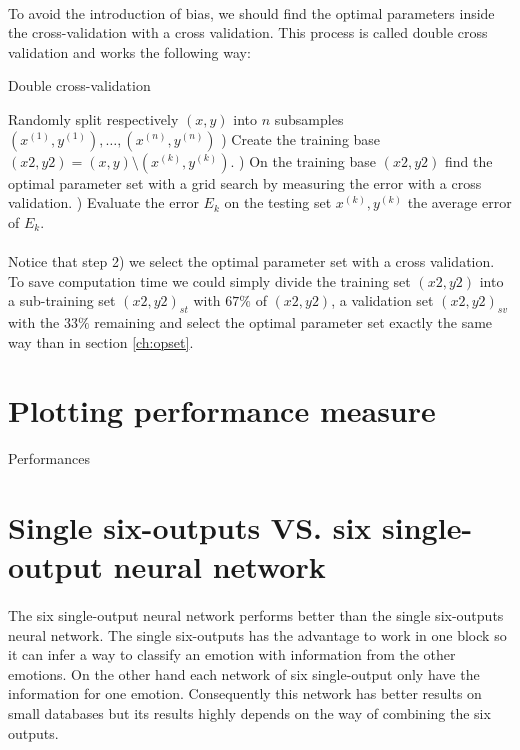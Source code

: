 \documentclass[a4paper,12pt,oneside,final]{report}
\begin{document}
\paragraph{}
To avoid the introduction of bias, we should find the optimal parameters inside the cross-validation with a cross validation. This process is called double cross validation and works the following way:
\begin{algorithm}[H]
\caption{Double cross-validation}
\label{al:dcv}
\begin{algorithmic}[1]
\STATE Randomly split respectively $(x, y)$ into $n$ subsamples $(x^{(1)}, y^{(1)}),\hdots,(x^{(n)}, y^{(n)})$
    ) Create the training base $(x2,y2)=(x, y)\setminus(x^{(k)}, y^{(k)})$.
    ) On the training base $(x2,y2)$ find the optimal parameter set with a grid search by measuring the error with a cross validation.
    ) Evaluate the error $E_k$ on the testing set $x^{(k)}, y^{(k)}$
\ENDFOR
{} the average error of $E_k$.
\end{algorithmic}
\end{algorithm}
\paragraph{}
Notice that step 2) we select the optimal parameter set with a cross validation. To save computation time we could simply divide the training set $(x2,y2)$ into a sub-training set $(x2,y2)_{st}$ with $67\%$ of $(x2,y2)$, a validation set $(x2,y2)_{sv}$ with the $33\%$ remaining and select the optimal parameter set exactly the same way than in section \ref{ch:opset}.

\section{Plotting performance measure}
{\color{red} Performances}

\section{Single six-outputs VS. six single-output neural network}
\paragraph{}
The six single-output neural network performs better than the single six-outputs neural network. The single six-outputs has the advantage to work in one block so it can infer a way to classify an emotion with information from the other emotions. On the other hand each network of six single-output only have the information for one emotion. Consequently this network has better results on small databases but its results highly depends on the way of combining the six outputs.
\end{document}
